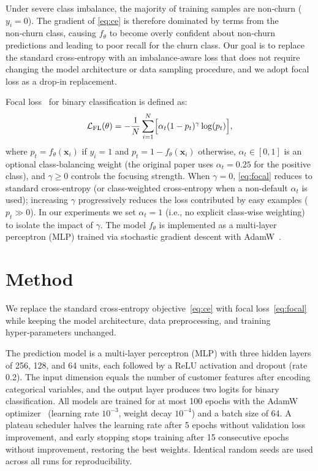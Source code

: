 \documentclass[11pt,a4paper]{article}
\begin{document}
Under severe class imbalance, the majority of training samples are non‑churn ($y_i=0$). The gradient of \eqref{eq:ce} is therefore dominated by terms from the non‑churn class, causing $f_\theta$ to become overly confident about non‑churn predictions and leading to poor recall for the churn class. Our goal is to replace the standard cross‑entropy with an imbalance‑aware loss that does not require changing the model architecture or data sampling procedure, and we adopt focal loss as a drop‑in replacement.

Focal loss~\cite{lin2017focal} for binary classification is defined as:
\begin{equation}
\mathcal{L}_{\mathrm{FL}}(\theta) = -\frac{1}{N}\sum_{i=1}^N\Bigl[ \alpha_t (1-p_t)^\gamma \log(p_t) \Bigr],
\label{eq:focal}
\end{equation}
where $p_t = f_\theta(\mathbf{x}_i)$ if $y_i=1$ and $p_t = 1-f_\theta(\mathbf{x}_i)$ otherwise, $\alpha_t \in [0,1]$ is an optional class‑balancing weight (the original paper uses $\alpha_t = 0.25$ for the positive class), and $\gamma \ge 0$ controls the focusing strength. When $\gamma=0$, \eqref{eq:focal} reduces to standard cross‑entropy (or class‑weighted cross‑entropy when a non‑default $\alpha_t$ is used); increasing $\gamma$ progressively reduces the loss contributed by easy examples ($p_t\gg 0$). In our experiments we set $\alpha_t = 1$ (i.e., no explicit class‑wise weighting) to isolate the impact of $\gamma$. The model $f_\theta$ is implemented as a multi‑layer perceptron (MLP) trained via stochastic gradient descent with AdamW~\cite{kingma2014adam}.

\section{Method}
\label{sec:method}
We replace the standard cross‑entropy objective~\eqref{eq:ce} with focal loss~\eqref{eq:focal} while keeping the model architecture, data preprocessing, and training hyper‑parameters unchanged.

The prediction model is a multi‑layer perceptron (MLP) with three hidden layers of 256, 128, and 64 units, each followed by a ReLU activation and dropout (rate 0.2).
The input dimension equals the number of customer features after encoding categorical variables, and the output layer produces two logits for binary classification.
All models are trained for at most 100 epochs with the AdamW optimizer~\cite{kingma2014adam} (learning rate $10^{-3}$, weight decay $10^{-4}$) and a batch size of 64.
A plateau scheduler halves the learning rate after 5 epochs without validation loss improvement, and early stopping stops training after 15 consecutive epochs without improvement, restoring the best weights.
Identical random seeds are used across all runs for reproducibility.
\end{document}
